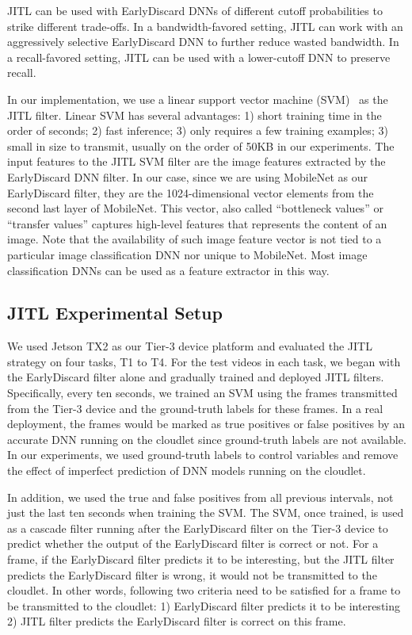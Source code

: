 JITL can be used with EarlyDiscard DNNs of different cutoff probabilities to
strike different trade-offs. In a bandwidth-favored setting, JITL can work with
an aggressively selective EarlyDiscard DNN to further reduce wasted bandwidth. In
a recall-favored setting, JITL can be used with a lower-cutoff DNN to preserve
recall.

In our implementation, we use a linear support vector machine
(SVM)~\cite{Friedman2001} as the JITL filter. Linear SVM has several advantages:
1) short training time in the order of seconds; 2) fast inference; 3) only
requires a few training examples; 3) small in size to transmit, usually on the
order of 50KB in our experiments. The input features to the JITL SVM filter are
the image features extracted by the EarlyDiscard DNN filter. In our case, since
we are using MobileNet as our EarlyDiscard filter, they are the 1024-dimensional
vector elements from the second last layer of MobileNet. This vector, also
called ``bottleneck values'' or ``transfer values'' captures high-level features
that represents the content of an image. Note that the availability of such
image feature vector is not tied to a particular image classification DNN nor
unique to MobileNet. Most image classification DNNs can be used as a feature
extractor in this way.

\subsection{JITL Experimental Setup}

We used Jetson TX2 as our Tier-3 device platform and evaluated the JITL strategy
on four tasks, T1 to T4. For the test videos in each task, we began with the
EarlyDiscard filter alone and gradually trained and deployed JITL filters.
Specifically, every ten seconds, we trained an SVM using the frames transmitted
from the Tier-3 device and the ground-truth labels for these frames. In a real
deployment, the frames would be marked as true positives or false positives by
an accurate DNN running on the cloudlet since ground-truth labels are not
available. In our experiments, we used ground-truth labels to control variables
and remove the effect of imperfect prediction of DNN models running on the
cloudlet. 

In addition, we used the true and false positives from all previous intervals,
not just the last ten seconds when training the SVM. The SVM, once trained, is
used as a cascade filter running after the EarlyDiscard filter on the Tier-3
device to predict whether the output of the EarlyDiscard filter is correct or
not. For a frame, if the EarlyDiscard filter predicts it to be interesting, but
the JITL filter predicts the EarlyDiscard filter is wrong, it would not be
transmitted to the cloudlet. In other words, following two criteria need to be
satisfied for a frame to be transmitted to the cloudlet: 1) EarlyDiscard filter
predicts it to be interesting 2) JITL filter predicts the EarlyDiscard filter is
correct on this frame.

